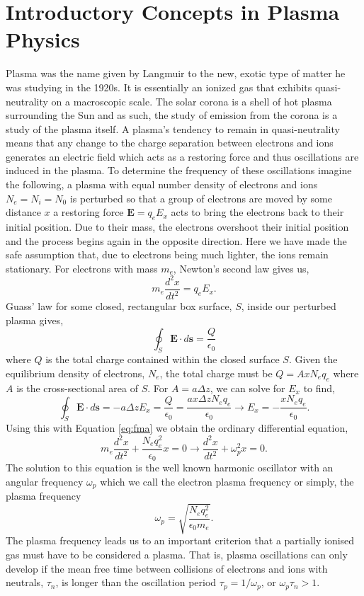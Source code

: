 \section{Introductory Concepts in Plasma Physics}
\label{sec:plasma_intro}
Plasma was the name given by Langmuir to the new, exotic type of matter he was studying in the 1920s. It is essentially an ionized gas that exhibits quasi-neutrality on a macroscopic scale. The solar corona is a shell of hot plasma surrounding the Sun and as such, the study of emission from the corona is a study of the plasma itself. A plasma's tendency to remain in quasi-neutrality means that any change to the charge separation between electrons and ions generates an electric field which acts as a restoring force and thus oscillations are induced in the plasma. To determine the frequency of these oscillations imagine the following, a plasma with equal number density of electrons and ions $N_e = N_i = N_0$ is perturbed so that a group of electrons are moved by some distance $x$ a restoring force $\mathbf{E} = q_e E_x$ acts to bring the electrons back to their initial position. Due to their mass, the electrons overshoot their initial position and the process begins again in the opposite direction. Here we have made the safe assumption that, due to electrons being much lighter, the ions remain stationary. For electrons with mass $m_e$, Newton's second law gives us,
\begin{equation}
\label{eq:fma}
m_e \frac{d^2x}{dt^2} = q_e E_x.
\end{equation}
Guass' law for some closed, rectangular box surface, $S$, inside our perturbed plasma gives, 
$$
\oint_S \mathbf{E} \cdot d\mathbf{s} = \frac{Q}{\epsilon_0}
$$
where $Q$ is the total charge contained within the closed surface $S$. Given the equilibrium density of electrons, $N_e$, the total charge must be $Q = A x N_e q_e$ where $A$ is the cross-sectional area of $S$. For $A=a\Delta z$, we can solve for  $E_x$ to find,
$$
\oint_S \mathbf{E} \cdot d\mathbf{s} = -a \Delta z E_x =  \frac{Q}{\epsilon_0} = \frac{ax\Delta z N_e q_e}{\epsilon_0} \rightarrow E_x = -\frac{x N_e q_e}{\epsilon_0}.
$$
Using this with Equation \ref{eq:fma} we obtain the ordinary differential equation,
\begin{equation}
\label{plasma_motion}
m_e \frac{d^2 x}{dt^2} + \frac{N_e q_e^2}{\epsilon_0} x = 0 \rightarrow \frac{d^2 x}{dt^2} + \omega_p^2 x = 0.
\end{equation}
The solution to this equation is the well known harmonic oscillator with an angular frequency $\omega_p$ which we call the electron plasma frequency or simply, the plasma frequency
\begin{equation}
\label{eq:plasma_freq}
\omega_p = \sqrt{\frac{N_e q_e^2}{\epsilon_0 m_e}}.
\end{equation}
The plasma frequency leads us to an important criterion that a partially ionised gas must have to be considered a plasma. That is, plasma oscillations can only develop if the mean free time between collisions of electrons and ions with neutrals, $\tau_n$, is longer than the oscillation period $\tau_p = 1/ \omega_p$, or $\omega_p \tau_n >1$.


